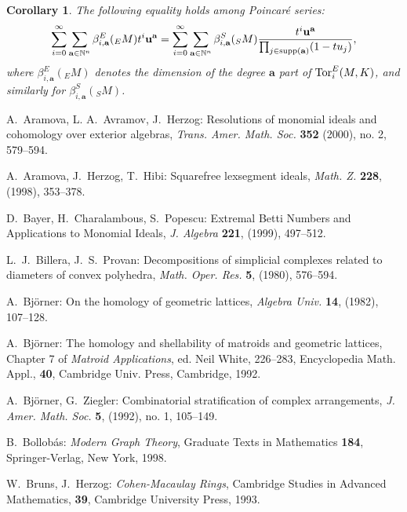 \documentclass{tran-l}
\newtheorem{corollary}[theorem]{Corollary}
\theoremstyle{definition}
\theoremstyle{remark}
\newcommand{\NN}{{\mathbb{N}}}
\newcommand{\baa}{{\mathbf{a}}}
\newcommand{\uu}{{\mathbf{u}}}
\newcommand{\tor}{\mathop{\rm Tor}\nolimits}
\newcommand{\supp}{\mathop{\rm supp}\nolimits}
\begin{document}
\begin{corollary}\label{betti} The  following equality holds among  Poincar\'e 
series:
\[\sum_{i=0}^\infty\sum_{\baa\in\NN^n}\beta_{i,\baa}^E(_EM)t^i\uu^\baa=
\sum_{i=0}^\infty\sum_{\baa\in\NN^n}\beta_{i,\baa}^S(_SM)
{{t^i\uu^\baa}\over{\prod_{j\in\supp(\baa)}(1-tu_j)}},\]
where $\beta_{i,\baa}^E(_EM)$ denotes the dimension of the 
degree $\baa$ part of $\tor^E_i(M,K)$, and similarly for
$\beta_{i,\baa}^S(_SM)$.\end{corollary}


\begin{thebibliography}{Bjo2}
 A.~Aramova, L. A.~Avramov, J.~Herzog: 
Resolutions of monomial ideals and cohomology over exterior algebras, 
{\sl Trans. Amer. Math. Soc.} \textbf{352} (2000), no. 2, 579--594.

 A.~Aramova, J.~Herzog, T.~Hibi: 
Squarefree lexsegment ideals, 
{\sl Math. Z.} \textbf{228}, (1998), 353--378.


 D.~Bayer, H.~Charalambous, S.~Popescu:
Extremal Betti Numbers and  Applications to Monomial Ideals,
{\sl J. Algebra} \textbf{221}, (1999), 497--512.

  L.~J.~Billera, J.~S.~Provan:  Decompositions of simplicial 
complexes related to diameters of convex polyhedra, 
{\sl Math. Oper. Res.} \textbf{5}, (1980), 576--594.


 A.~Bj\"orner: On the homology of geometric lattices, 
{\sl   Algebra Univ.}  \textbf{14}, (1982), 107--128.


 A.~Bj\"orner: The homology and shellability of matroids
and
geometric lattices, Chapter 7 of {\it Matroid Applications}, ed.
Neil White, 226--283, Encyclopedia Math. Appl., \textbf{40}, Cambridge
Univ. Press, Cambridge, 1992.  
  
 A.~Bj\"orner, G.~Ziegler: 
Combinatorial stratification of complex arrangements, 
{\sl J. Amer. Math. Soc.} \textbf{5}, (1992), no. 1, 105--149. 

B.~Bollob\'as: {\it Modern Graph Theory}, Graduate Texts
in Mathematics \textbf{184}, Springer-Verlag, New York, 1998.

 W.~Bruns, J.~Herzog: {\it Cohen-Macaulay Rings}, Cambridge
Studies in Advanced Mathematics, \textbf{39}, Cambridge University
Press, 1993.  
  

\end{thebibliography}
\end{document}
